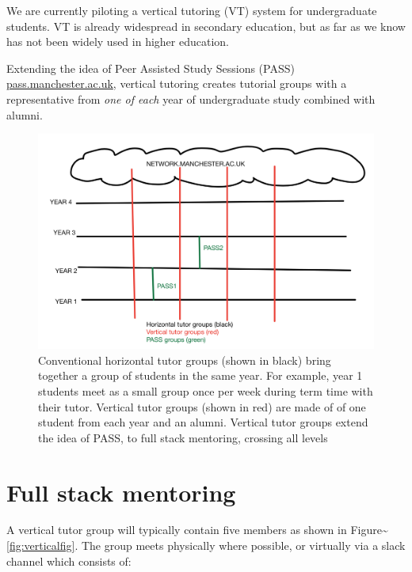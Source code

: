 \documentclass[12pt,]{book}
\begin{document}
We are currently piloting a vertical tutoring (VT) system for undergraduate students. VT is already widespread in secondary education, \citep{vtbernard} \citep{druryvert} but as far as we know has not been widely used in higher education.

Extending the idea of Peer Assisted Study Sessions (PASS) \href{http://www.pass.manchester.ac.uk}{pass.manchester.ac.uk}, vertical tutoring creates tutorial groups with a representative from \emph{one of each} year of undergraduate study combined with alumni.

\begin{figure}

{\centering \includegraphics[width=1\linewidth]{images/vertical-tutor-groups} 

}

\caption{Conventional horizontal tutor groups (shown in black) bring together a group of students in the same year. For example, year 1 students meet as a small group once per week during term time with their tutor. Vertical tutor groups (shown in red) are made of of one student from each year and an alumni. Vertical tutor groups extend the idea of PASS, to full stack mentoring, crossing all levels}\label{fig:unnamed-chunk-7}
\end{figure}

\hypertarget{full-stack-mentoring}{%
\section{Full stack mentoring}\label{full-stack-mentoring}}

A vertical tutor group will typically contain five members as shown in Figure\textasciitilde{}\ref{fig:verticalfig}. The group meets physically where possible, or virtually via a slack channel which consists of:
\end{document}
